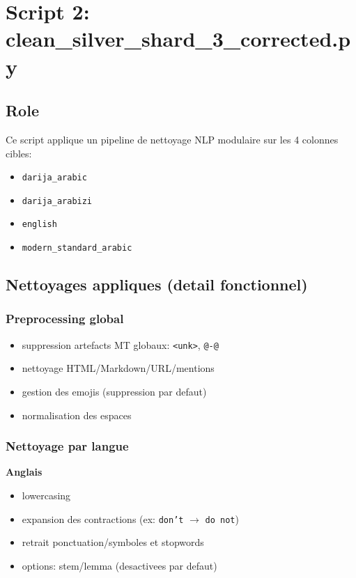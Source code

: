 \documentclass[11pt,a4paper]{article}
\begin{document}
\section{Script 2: clean\_silver\_shard\_3\_corrected.py}
\subsection{Role}
Ce script applique un pipeline de nettoyage NLP modulaire sur les 4 colonnes cibles:
\begin{itemize}[leftmargin=*]
  \item \texttt{darija\_arabic}
  \item \texttt{darija\_arabizi}
  \item \texttt{english}
  \item \texttt{modern\_standard\_arabic}
\end{itemize}

\subsection{Nettoyages appliques (detail fonctionnel)}
\subsubsection{Preprocessing global}
\begin{itemize}[leftmargin=*]
  \item suppression artefacts MT globaux: \texttt{<unk>}, \texttt{@-@}
  \item nettoyage HTML/Markdown/URL/mentions
  \item gestion des emojis (suppression par defaut)
  \item normalisation des espaces
\end{itemize}

\subsubsection{Nettoyage par langue}
\textbf{Anglais}
\begin{itemize}[leftmargin=*]
  \item lowercasing
  \item expansion des contractions (ex: \texttt{don't} $\rightarrow$ \texttt{do not})
  \item retrait ponctuation/symboles et stopwords
  \item options: stem/lemma (desactivees par defaut)
\end{itemize}
\end{document}
